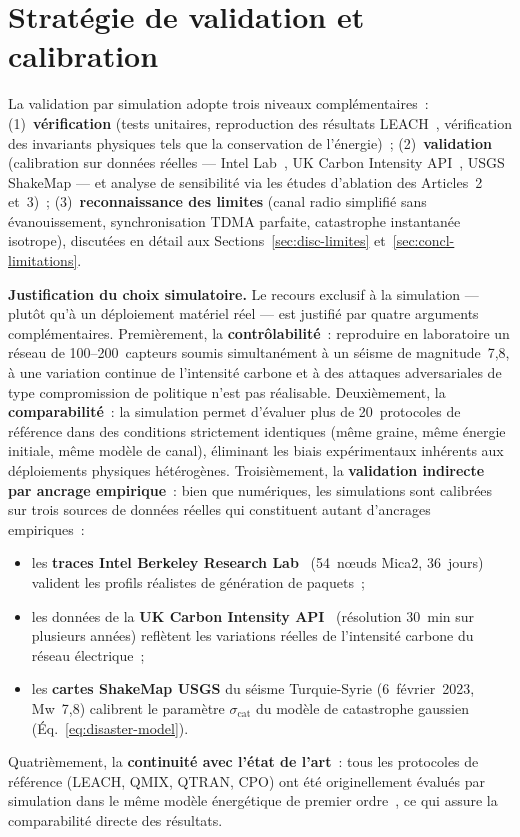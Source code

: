 \section{Stratégie de validation et calibration}\label{sec:demarche-validation}

La validation par simulation adopte trois niveaux complémentaires~: (1)~\textbf{vérification} (tests unitaires, reproduction des résultats LEACH~\cite{heinzelman2000leach}, vérification des invariants physiques tels que la conservation de l'énergie)~; (2)~\textbf{validation} (calibration sur données réelles --- Intel Lab~\cite{intel_lab_data}, UK Carbon Intensity API~\cite{uk_carbon_api}, USGS ShakeMap --- et analyse de sensibilité via les études d'ablation des Articles~2 et~3)~; (3)~\textbf{reconnaissance des limites} (canal radio simplifié sans évanouissement, synchronisation TDMA parfaite, catastrophe instantanée isotrope), discutées en détail aux Sections~\ref{sec:disc-limites} et~\ref{sec:concl-limitations}.

\medskip
\noindent\textbf{Justification du choix simulatoire.}
Le recours exclusif à la simulation --- plutôt qu'à un déploiement matériel réel --- est justifié par quatre arguments complémentaires. Premièrement, la \textbf{contrôlabilité}~: reproduire en laboratoire un réseau de 100--200~capteurs soumis simultanément à un séisme de magnitude~7,8, à une variation continue de l'intensité carbone et à des attaques adversariales de type compromission de politique n'est pas réalisable. Deuxièmement, la \textbf{comparabilité}~: la simulation permet d'évaluer plus de 20~protocoles de référence dans des conditions strictement identiques (même graine, même énergie initiale, même modèle de canal), éliminant les biais expérimentaux inhérents aux déploiements physiques hétérogènes. Troisièmement, la \textbf{validation indirecte par ancrage empirique}~: bien que numériques, les simulations sont calibrées sur trois sources de données réelles qui constituent autant d'ancrages empiriques~:
\begin{itemize}
    \item les \textbf{traces Intel Berkeley Research Lab}~\cite{intel_lab_data} (54~nœuds Mica2, 36~jours) valident les profils réalistes de génération de paquets~;
    \item les données de la \textbf{UK Carbon Intensity API}~\cite{uk_carbon_api} (résolution 30~min sur plusieurs années) reflètent les variations réelles de l'intensité carbone du réseau électrique~;
    \item les \textbf{cartes ShakeMap USGS} du séisme Turquie-Syrie (6~février~2023, Mw~7,8) calibrent le paramètre $\sigma_{\text{cat}}$ du modèle de catastrophe gaussien (Éq.~\ref{eq:disaster-model}).
\end{itemize}
Quatrièmement, la \textbf{continuité avec l'état de l'art}~: tous les protocoles de référence (LEACH, QMIX, QTRAN, CPO) ont été originellement évalués par simulation dans le même modèle énergétique de premier ordre~\cite{heinzelman2000leach}, ce qui assure la comparabilité directe des résultats.


